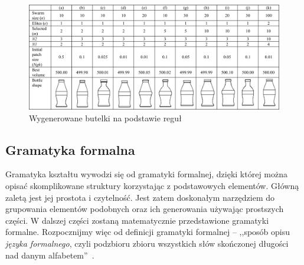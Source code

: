 \begin{figure}[h!]
\centering
\includegraphics[width=15cm]{images/bootles.png}
\caption{Wygenerowane butelki na podstawie reguł~\cite{link10}}
\label{coca_cola_all}
\end{figure}

\subsection{Gramatyka formalna}
Gramatyka kształtu wywodzi się od gramatyki formalnej, dzięki której można
opisać skomplikowane struktury korzystając z podstawowych elementów.
Główną zaletą jest jej prostota i czytelność. Jest zatem doskonałym narzędziem
do grupowania elementów podobnych oraz ich generowania używając prostszych
części. W dalszej części zostaną matematycznie przedstawione gramatyki formalne.
Rozpocznijmy więc od definicji gramatyki formalnej -- ,,sposób opisu {\em języka
formalnego}, czyli podzbioru zbioru wszystkich słów skończonej długości nad
danym alfabetem''~\cite{wiki02}.

